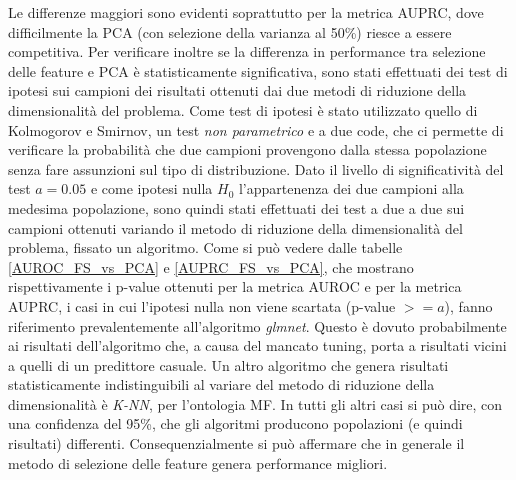 \documentclass[12pt]{report}
\begin{document}
Le differenze maggiori sono evidenti soprattutto per la metrica AUPRC, dove difficilmente la PCA (con selezione della varianza al 50\%) riesce a essere competitiva. 
\newline
\newline
Per verificare inoltre se la differenza in performance tra selezione delle feature e PCA è statisticamente significativa, sono stati effettuati dei test di ipotesi sui campioni dei risultati ottenuti dai due metodi di riduzione della dimensionalità del problema.
\newline
\newline
Come test di ipotesi è stato utilizzato quello di Kolmogorov e Smirnov\cite{ROSS}, un test \emph{non parametrico} e a due code, che ci permette di verificare la probabilità che due campioni provengono dalla stessa popolazione senza fare assunzioni sul tipo di distribuzione.
\newline
\newline
Dato il livello di significatività del test $a=0.05$ e come ipotesi nulla $H_0$ l'appartenenza dei due campioni alla medesima popolazione, sono quindi stati effettuati dei test a due a due sui campioni ottenuti variando il metodo di riduzione della dimensionalità del problema, fissato un algoritmo. Come si può vedere dalle tabelle \ref{AUROC_FS_vs_PCA} e \ref{AUPRC_FS_vs_PCA}, che mostrano rispettivamente i p-value ottenuti per la metrica AUROC e per la metrica AUPRC, i casi in cui l'ipotesi nulla non viene scartata (p-value $>= a$), fanno riferimento prevalentemente all'algoritmo \emph{glmnet}. Questo è dovuto probabilmente ai risultati dell'algoritmo che, a causa del mancato tuning, porta a risultati vicini a quelli di un predittore casuale. Un altro algoritmo che genera risultati statisticamente indistinguibili al variare del metodo di riduzione della dimensionalità è \emph{K-NN}, per l'ontologia MF. In tutti gli altri casi si può dire, con una confidenza del 95\%, che gli algoritmi producono popolazioni (e quindi risultati) differenti. Consequenzialmente si può affermare che in generale il metodo di selezione delle feature genera performance migliori.
\end{document}
